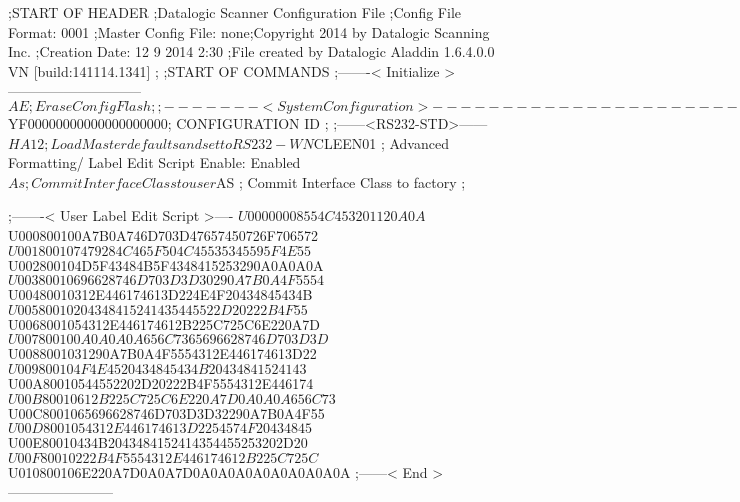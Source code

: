 ;START OF HEADER
;Datalogic Scanner Configuration File
;Config File Format: 0001
;Master Config File: none;Copyright 2014 by Datalogic Scanning Inc.
;Creation Date: 12 9 2014 2:30
;File created by Datalogic Aladdin 1.6.4.0.0 VN [build:141114.1341]
;
;START OF COMMANDS
;-------< Initialize >-----------------------------
$AE                 ; Erase Config Flash
;
;-------< System Configuration >-------------------------------
$YF00000000000000000000; CONFIGURATION ID
;
;------<RS232-STD>------
$HA12               ; Load Master defaults and set to RS232-WN
$CLEEN01            ; Advanced Formatting/ Label Edit Script Enable: Enabled
$As                 ; Commit Interface Class to user
$AS                 ; Commit Interface Class to factory
;

;-------< User Label Edit Script >----
$U00000008554C453201120A0A
$U000800100A7B0A746D703D47657450726F706572
$U001800107479284C465F504C45535345595F4E55
$U002800104D5F43484B5F4348415253290A0A0A0A
$U00380010696628746D703D3D30290A7B0A4F5554
$U00480010312E446174613D224E4F20434845434B
$U00580010204348415241435445522D20222B4F55
$U0068001054312E446174612B225C725C6E220A7D
$U007800100A0A0A0A656C7365696628746D703D3D
$U0088001031290A7B0A4F5554312E446174613D22
$U009800104F4E4520434845434B20434841524143
$U00A80010544552202D20222B4F5554312E446174
$U00B80010612B225C725C6E220A7D0A0A0A656C73
$U00C8001065696628746D703D3D32290A7B0A4F55
$U00D8001054312E446174613D2254574F20434845
$U00E80010434B2043484152414354455253202D20
$U00F80010222B4F5554312E446174612B225C725C
$U010800106E220A7D0A0A7D0A0A0A0A0A0A0A0A0A
;------< End >-----------------------
